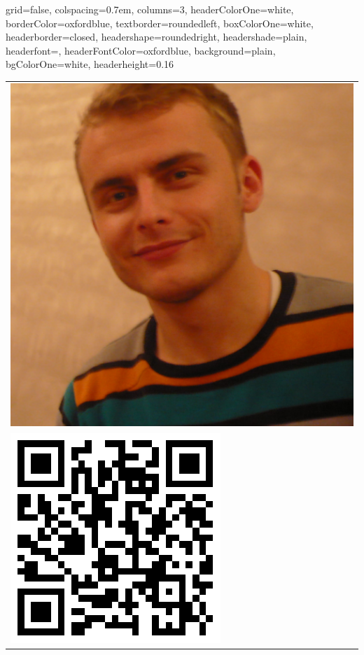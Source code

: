 \documentclass[portrait,a0paper,fontscale=0.292]{baposter}
\begin{document}
\begin{poster}{
 grid=false,
 colspacing=0.7em,
 columns=3,
 headerColorOne=white,
 borderColor=oxfordblue,
 textborder=roundedleft,
 boxColorOne=white,
 headerborder=closed,
 headershape=roundedright,
 headershade=plain,
 headerfont=\textsf,
 headerFontColor=oxfordblue,
 background=plain,
 bgColorOne=white,
 headerheight=0.16\textheight}
 {\begin{tabular}{l}
      \includegraphics[width=0.075\textheight]{LinusSchumacher.jpg} \\
      \includegraphics[width=0.075\textheight]{qrcode.png}

\end{tabular}}
\end{poster}
\end{document}
